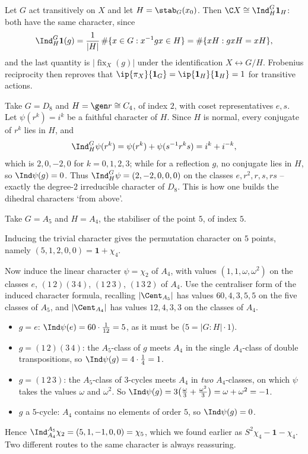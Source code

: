 \begin{example}
	Let $G$ act transitively on $X$ and let $H = \stab_G(x_0)$. Then $\C X \cong \Ind_H^G\mathbf 1_H$: both have the same character, since
	$$\Ind_H^G\mathbf 1(g) = \frac{1}{|H|}\,\#\{x\in G : x^{-1}gx\in H\} = \#\{xH : gxH = xH\},$$
	and the last quantity is $|\operatorname{fix}_X(g)|$ under the identification $X \leftrightarrow G/H$. Frobenius reciprocity then reproves that $\ip{\pi_X}{\mathbf 1_G} = \ip{\mathbf1_H}{\mathbf 1_H} = 1$ for transitive actions.
\end{example}

\begin{example}
	Take $G = D_8$ and $H = \gen r\cong C_4$, of index $2$, with coset representatives $e, s$. Let $\psi(r^k) = i^k$ be a faithful character of $H$. Since $H$ is normal, every conjugate of $r^k$ lies in $H$, and
	$$\Ind_H^G\psi(r^k) = \psi(r^k) + \psi(s^{-1}r^ks) = i^k + i^{-k},$$
	which is $2, 0, -2, 0$ for $k = 0,1,2,3$; while for a reflection $g$, no conjugate lies in $H$, so $\Ind\psi(g) = 0$. Thus $\Ind_H^G\psi = (2,-2,0,0,0)$ on the classes $e, r^2, r, s, rs$ -- exactly the degree-$2$ irreducible character of $D_8$. This is how one builds the dihedral characters `from above'.
\end{example}

\begin{example}
	Take $G = A_5$ and $H = A_4$, the stabiliser of the point $5$, of index $5$.

	Inducing the trivial character gives the permutation character on $5$ points, namely $(5,1,2,0,0) = \mathbf 1 + \chi_4$.

	Now induce the linear character $\psi = \chi_2$ of $A_4$, with values $(1,1,\omega,\omega^2)$ on the classes $e$, $(1\,2)(3\,4)$, $(1\,2\,3)$, $(1\,3\,2)$ of $A_4$. Use the centraliser form of the induced character formula, recalling $|\Cent_{A_5}|$ has values $60, 4, 3, 5, 5$ on the five classes of $A_5$, and $|\Cent_{A_4}|$ has values $12, 4, 3, 3$ on the classes of $A_4$.
	\begin{itemize}
		\item $g = e$: \; $\Ind\psi(e) = 60\cdot\frac{1}{12} = 5$, as it must be ($5 = |G:H|\cdot 1$).
		\item $g = (1\,2)(3\,4)$: the $A_5$-class of $g$ meets $A_4$ in the single $A_4$-class of double transpositions, so $\Ind\psi(g) = 4\cdot\frac{1}{4} = 1$.
		\item $g = (1\,2\,3)$: the $A_5$-class of $3$-cycles meets $A_4$ in \emph{two} $A_4$-classes, on which $\psi$ takes the values $\omega$ and $\omega^2$. So $\Ind\psi(g) = 3\big(\frac{\omega}{3}+\frac{\omega^2}{3}\big) = \omega+\omega^2 = -1$.
		\item $g$ a $5$-cycle: $A_4$ contains no elements of order $5$, so $\Ind\psi(g) = 0$.
	\end{itemize}
	Hence $\Ind_{A_4}^{A_5}\chi_2 = (5,1,-1,0,0) = \chi_5$, which we found earlier as $S^2\chi_4 - \mathbf 1-\chi_4$. Two different routes to the same character is always reassuring.
\end{example}

